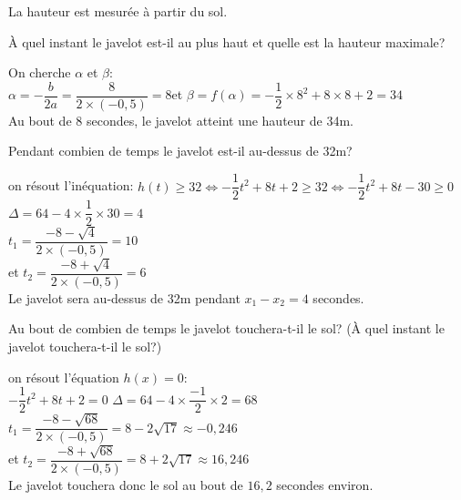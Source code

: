 \documentclass[12pt,a4paper]{article}  %
\begin{document}
La hauteur est mesurée à partir du sol.
\begin{enumMet}
	\item À quel instant le javelot est-il au plus haut et quelle est la hauteur maximale? \quad {}
	\begin{corrBox}
		On cherche $\alpha$ et $\beta$:\\
		$\alpha=-\dfrac{b}{2a}=\dfrac{8}{2\times (-0,5)}=8$\quad\quad et \quad\quad 	$\beta=f(\alpha)=-\dfrac{1}{2}\times 8^2+8\times 8+2=34$\\
		Au bout de 8 secondes, le javelot atteint une hauteur de 34m.
	\end{corrBox}
	\item Pendant combien de temps le javelot est-il au-dessus de 32m? \quad \bareme{2}
	\begin{corrBox}
		on résout l'inéquation:
		$h(t)\geqslant32 \iff -\dfrac{1}{2} t^2+8 t+2\geqslant32 \iff -\dfrac{1}{2} t^2+8 t-30\geqslant0$\\
		$\Delta=64-4\times\dfrac{1}{2}\times30 =4$\\
		$t_1=\dfrac{-8-\sqrt{4}}{2\times(-0,5)}=10$\\
		et $t_2=\dfrac{-8+\sqrt{4}}{2\times(-0,5)}=6$\\
		Le javelot sera au-dessus de 32m pendant $x_1-x_2=4$ secondes.
	\end{corrBox}
	\item Au bout de combien de temps le javelot touchera-t-il le sol? (À quel instant le javelot touchera-t-il le sol?) \quad \bareme{1}
	\begin{corrBox}
		on résout l'équation $h(x)=0$:\\
		$-\dfrac{1}{2} t^2+8 t+2=0$
		$\Delta=64-4\times\dfrac{-1}{2}\times2 =68$\\
		$t_1=\dfrac{-8-\sqrt{68}}{2\times(-0,5)}=8-2\sqrt{17}\approx-0,246$\\
		et $t_2=\dfrac{-8+\sqrt{68}}{2\times(-0,5)}=8+2\sqrt{17}\approx 16,246$\\
		Le javelot touchera donc le sol au bout de $16,2$ secondes environ.	
	\end{corrBox}
\end{enumMet}
\end{document}
